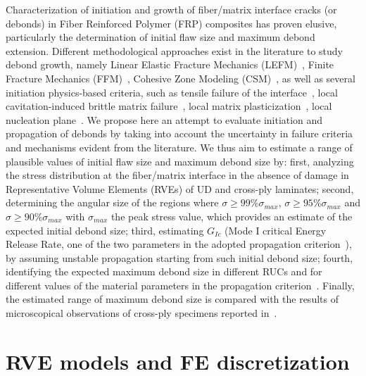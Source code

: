 Characterization of initiation and growth of fiber/matrix interface cracks (or debonds) in Fiber Reinforced Polymer (FRP) composites has proven elusive, particularly the determination of initial flaw size and maximum debond extension. Different methodological approaches exist in the literature to study debond growth, namely Linear Elastic Fracture Mechanics (LEFM)~\cite{Paris2007}, Finite Fracture Mechanics (FFM)~\cite{Mantic2009}, Cohesive Zone Modeling (CSM)~\cite{Canal2012}, as well as several initiation physics-based criteria, such as tensile failure of the interface~\cite{Paris2007}, local cavitation-induced brittle matrix failure~\cite{Asp1996a,Asp1996b}, local matrix plasticization~\cite{Canal2012}, local nucleation plane~\cite{Carraro2014}. We propose here an attempt to evaluate initiation and propagation of debonds by taking into account the uncertainty in failure criteria and mechanisms evident from the literature. We thus aim to estimate a range of plausible values of initial flaw size and maximum debond size by: first, analyzing the stress distribution at the fiber/matrix interface in the absence of damage in Representative Volume Elements (RVEs) of UD and cross-ply laminates; second, determining the angular size of the regions where $\sigma\geq99\%\sigma_{max}$, $\sigma\geq95\%\sigma_{max}$ and $\sigma\geq90\%\sigma_{max}$ with $\sigma_{max}$ the peak stress value, which provides an estimate of the expected initial debond size; third, estimating $G_{Ic}$ (Mode I critical Energy Release Rate, one of the two parameters in the adopted propagation criterion~\cite{Hutchinson1991}), by assuming unstable propagation starting from such initial debond size; fourth, identifying the expected maximum debond size in different RUCs and for different values of the material parameters in the propagation criterion~\cite{Hutchinson1991}. Finally, the estimated range of maximum debond size is compared with the results of microscopical observations of cross-ply specimens reported in~\cite{Correa2018}.

\section{RVE models and FE discretization}

